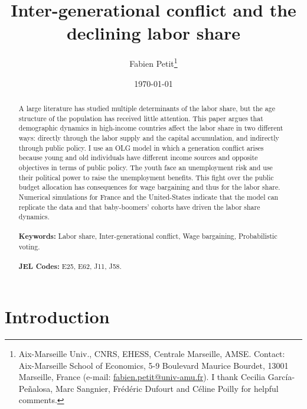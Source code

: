 \documentclass[12pt]{article}
\begin{document}
	
	\begin{titlepage}
		\title{Inter-generational conflict and the declining labor share}
		\author{Fabien Petit\thanks{Aix-Marseille Univ., CNRS, EHESS, Centrale Marseille, AMSE. Contact: Aix-Marseille School of Economics, 5-9 Boulevard Maurice Bourdet, 13001 Marseille, France (e-mail: \href{mailto:fabien.petit@univ-amu.fr}{fabien.petit@univ-amu.fr}). I thank Cecilia García-Peñalosa, Marc Sangnier, Frédéric Dufourt and Céline Poilly for helpful comments.}}
		\date{\today}
		\maketitle
		\begin{abstract}
			\noindent A large literature has studied multiple determinants of the labor share, but the age structure of the population has received little attention. This paper argues that demographic dynamics in high-income countries affect the labor share in two different ways: directly through the labor supply and the capital accumulation, and indirectly through public policy. I use an OLG model in which a generation conflict arises because young and old individuals have different income sources and opposite objectives in terms of public policy. The youth face an unemployment risk and use their political power to raise the unemployment benefits. This fight over the public budget allocation has consequences for wage bargaining and thus for the labor share. Numerical simulations for France and the United-States indicate that the model can replicate the data and that baby-boomers' cohorts have driven the labor share dynamics.\\
			\vspace{0in}\\
			\noindent\textbf{Keywords:} Labor share, Inter-generational conflict, Wage bargaining, Probabilistic voting.\\
			\vspace{0in}\\
			\noindent\textbf{JEL Codes:} E25, E62, J11, J58.\\
			
			\bigskip
		\end{abstract}
		\setcounter{page}{0}
		\thispagestyle{empty}
	\end{titlepage}
	\pagebreak \newpage
	
	\doublespacing
	
	\section{Introduction} \label{sec:introduction}
	
	
\end{document}
